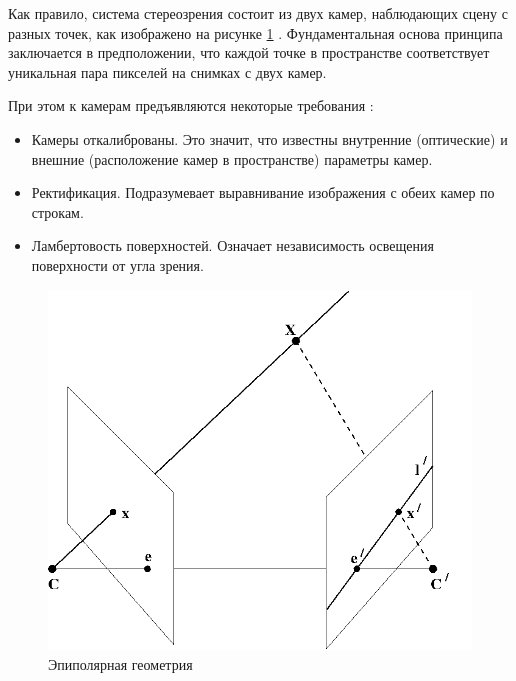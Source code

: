 Как правило, система стереозрения состоит из двух камер, наблюдающих сцену с разных точек, как изображено на рисунке \ref{pic:epipol} \cite{Hartley2004}. Фундаментальная основа принципа    %
заключается в предположении, что каждой точке в пространстве соответствует уникальная пара пикселей на снимках с двух камер.  

При этом к камерам предъявляются некоторые требования \cite{rusoverview}:   %
\begin{itemize}
	\item Камеры откалиброваны. Это значит, что известны внутренние (оптические) и внешние (расположение камер в пространстве) параметры камер. 
	\item Ректификация. Подразумевает выравнивание изображения с обеих камер по строкам.  %
	\item Ламбертовость поверхностей. Означает независимость освещения поверхности от угла зрения. 
\end{itemize}

\begin{figure}[H]
	\begin{center}
		\includegraphics[scale=0.5]{pics/epipolar geometry.png}
		\caption{Эпиполярная геометрия} 
		\label{pic:epipol} %
	\end{center}
\end{figure}

